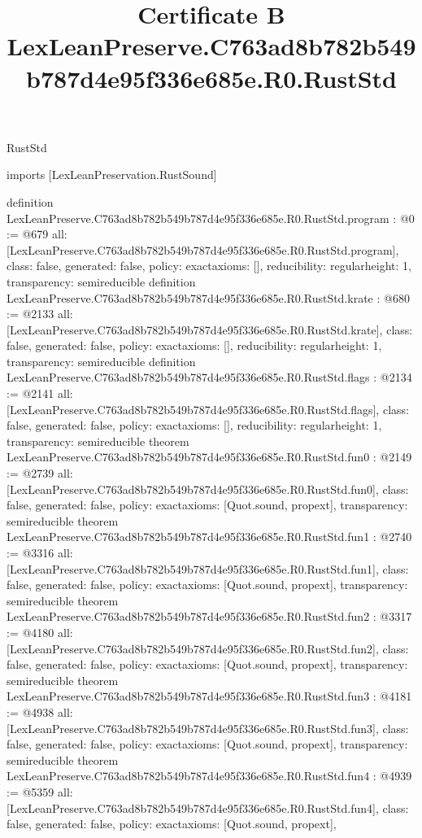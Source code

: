 \begin{lexlean}{RustStd}
\title{Certificate B LexLeanPreserve.C763ad8b782b549b787d4e95f336e685e.R0.RustStd}
\begin{coremodule}
imports [LexLeanPreservation.RustSound]

definition LexLeanPreserve.C763ad8b782b549b787d4e95f336e685e.R0.RustStd.program : @0 := @679 {
  all: [LexLeanPreserve.C763ad8b782b549b787d4e95f336e685e.R0.RustStd.program],
  class: false,
  generated: false,
  policy: exact{axioms: []},
  reducibility: regular{height: 1},
  transparency: semireducible
}
definition LexLeanPreserve.C763ad8b782b549b787d4e95f336e685e.R0.RustStd.krate : @680 := @2133 {
  all: [LexLeanPreserve.C763ad8b782b549b787d4e95f336e685e.R0.RustStd.krate],
  class: false,
  generated: false,
  policy: exact{axioms: []},
  reducibility: regular{height: 1},
  transparency: semireducible
}
definition LexLeanPreserve.C763ad8b782b549b787d4e95f336e685e.R0.RustStd.flags : @2134 := @2141 {
  all: [LexLeanPreserve.C763ad8b782b549b787d4e95f336e685e.R0.RustStd.flags],
  class: false,
  generated: false,
  policy: exact{axioms: []},
  reducibility: regular{height: 1},
  transparency: semireducible
}
theorem LexLeanPreserve.C763ad8b782b549b787d4e95f336e685e.R0.RustStd.fun0 : @2149 := @2739 {
  all: [LexLeanPreserve.C763ad8b782b549b787d4e95f336e685e.R0.RustStd.fun0],
  class: false,
  generated: false,
  policy: exact{axioms: [Quot.sound, propext]},
  transparency: semireducible
}
theorem LexLeanPreserve.C763ad8b782b549b787d4e95f336e685e.R0.RustStd.fun1 : @2740 := @3316 {
  all: [LexLeanPreserve.C763ad8b782b549b787d4e95f336e685e.R0.RustStd.fun1],
  class: false,
  generated: false,
  policy: exact{axioms: [Quot.sound, propext]},
  transparency: semireducible
}
theorem LexLeanPreserve.C763ad8b782b549b787d4e95f336e685e.R0.RustStd.fun2 : @3317 := @4180 {
  all: [LexLeanPreserve.C763ad8b782b549b787d4e95f336e685e.R0.RustStd.fun2],
  class: false,
  generated: false,
  policy: exact{axioms: [Quot.sound, propext]},
  transparency: semireducible
}
theorem LexLeanPreserve.C763ad8b782b549b787d4e95f336e685e.R0.RustStd.fun3 : @4181 := @4938 {
  all: [LexLeanPreserve.C763ad8b782b549b787d4e95f336e685e.R0.RustStd.fun3],
  class: false,
  generated: false,
  policy: exact{axioms: [Quot.sound, propext]},
  transparency: semireducible
}
theorem LexLeanPreserve.C763ad8b782b549b787d4e95f336e685e.R0.RustStd.fun4 : @4939 := @5359 {
  all: [LexLeanPreserve.C763ad8b782b549b787d4e95f336e685e.R0.RustStd.fun4],
  class: false,
  generated: false,
  policy: exact{axioms: [Quot.sound, propext]},
}
\end{coremodule}
\end{lexlean}
